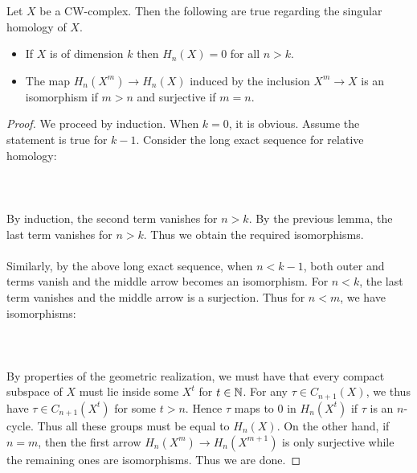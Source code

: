 \documentclass[a4paper]{article}
\begin{document}
\begin{lmm}{}{} Let $X$ be a CW-complex. Then the following are true regarding the singular homology of $X$. 
\begin{itemize}
\item If $X$ is of dimension $k$ then $H_n(X)=0$ for all $n>k$. 
\item The map $H_n(X^m)\to H_n(X)$ induced by the inclusion $X^m\to X$ is an isomorphism if $m>n$ and surjective if $m=n$. 
\end{itemize} \tcbline
\begin{proof}
We proceed by induction. When $k=0$, it is obvious. Assume the statement is true for $k-1$. Consider the long exact sequence for relative homology: \\~\\
\\~\\
By induction, the second term vanishes for $n>k$. By the previous lemma, the last term vanishes for $n>k$. Thus we obtain the required isomorphisms. \\~\\

Similarly, by the above long exact sequence, when $n<k-1$, both outer and terms vanish and the middle arrow becomes an isomorphism. For $n<k$, the last term vanishes and the middle arrow is a surjection. Thus for $n<m$, we have isomorphisms: \\~\\
\\~\\
By properties of the geometric realization, we must have that every compact subspace of $X$ must lie inside some $X^t$ for $t\in\mathbb{N}$. For any $\tau\in C_{n+1}(X)$, we thus have $\tau\in C_{n+1}(X^t)$ for some $t>n$. Hence $\tau$ maps to $0$ in $H_n(X^t)$ if $\tau$ is an $n$-cycle. Thus all these groups must be equal to $H_n(X)$. On the other hand, if $n=m$, then the first arrow $H_n(X^m)\to H_n(X^{m+1})$ is only surjective while the remaining ones are isomorphisms. Thus we are done. 
\end{proof}
\end{lmm}
\end{document}
